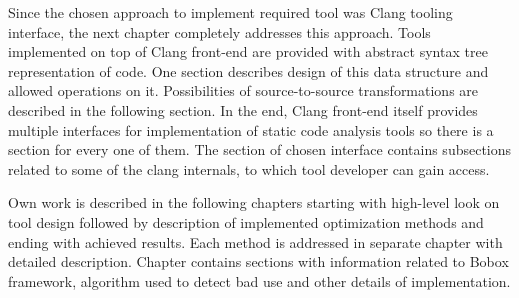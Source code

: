 Since the chosen approach to implement required tool was Clang tooling interface, the next chapter completely addresses this approach. Tools implemented on top of Clang front-end are provided with abstract syntax tree representation of code. One section describes design of this data structure and allowed operations on it. Possibilities of source-to-source transformations are described in the following section. In the end, Clang front-end itself provides multiple interfaces for implementation of static code analysis tools so there is a section for every one of them. The section of chosen interface contains subsections related to some of the clang internals, to which tool developer can gain access.

Own work is described in the following chapters starting with high-level look on tool design followed by description of implemented optimization methods and ending with achieved results. Each method is addressed in separate chapter with detailed description. Chapter contains sections with information related to Bobox framework, algorithm used to detect bad use and other details of implementation.